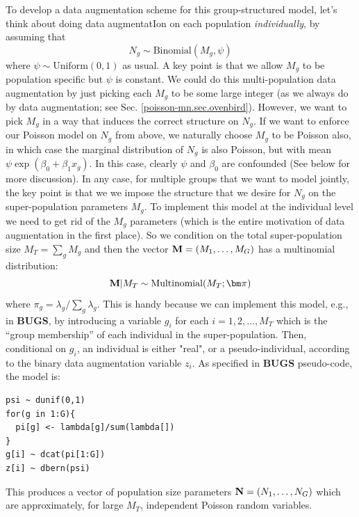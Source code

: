 To develop a data augmentation scheme for this group-structured model,
let's think about doing data augmentatIon on each population {\it
  individually}, by assuming that
\[
 N_{g} \sim \mbox{Binomial}(M_{g} , \psi)
\]
where $\psi \sim \mbox{Uniform}(0,1)$ as usual.  A key point is that
we allow $M_{g}$ to be population specific but $\psi$ is constant.  We
could do this multi-population data augmentation by just picking each
$M_{g}$ to be some large integer (as we always do by data
augmentation; see Sec. \ref{poisson-mn.sec.ovenbird}). However, we
want to pick $M_{g}$ in a way that induces 
the correct structure on
$N_{g}$. If we want to enforce our Poisson model on $N_{g}$ from
above, we naturally choose $M_{g}$ to be Poisson also, in which case
the marginal distribution of $N_{g}$ is also Poisson, but with mean
$\psi \exp(\beta_{0} + \beta_{1}x_{g})$.  In this case, clearly $\psi$ and
$\beta_{0}$ are confounded (See below for more discussion).
In any case, for multiple groups that we want to model jointly, the
key point is that we 
we impose the structure that we desire for $N_{g}$ on the
super-population parameters $M_{g}$.  To implement this model at the
individual level we need to get rid of the $M_{g}$ parameters (which
is the entire motivation of data augmentation in the first place). So
we condition on the total super-population size $M_{T}= \sum_{g}
M_{g}$ and then the vector ${\bf M} = (M_{1},\ldots,M_{G})$ has a
multinomial distribution:
\begin{equation}
{\bf M}|M_{T} \sim \mbox{Multinomial}(M_{T};  {\bm \pi} ) 
\label{eq.mn1}
\end{equation}
where 
$\pi_{g} = \lambda_{g}/\sum_{g} \lambda_{g}$.  This is handy because
we can implement this model, e.g., in {\bf BUGS}, by introducing a
variable $g_{i}$ for each $i=1,2,\ldots, M_{T}$ which is the ``group
membership'' of each individual in the super-population.  Then,
conditional on $g_{i}$, an individual is either "real", or a
pseudo-individual, according to the binary data augmentation variable
$z_{i}$.  As specified in {\bf BUGS} pseudo-code, the
model is:
\begin{verbatim}
psi ~ dunif(0,1)
for(g in 1:G){
  pi[g] <- lambda[g]/sum(lambda[])
}
g[i] ~ dcat(pi[1:G])
z[i] ~ dbern(psi)
\end{verbatim}
This produces a vector of population size parameters ${\bf N} =
(N_{1},\ldots,N_{G})$ which are approximately, for large $M_{T}$,
independent Poisson random variables.

